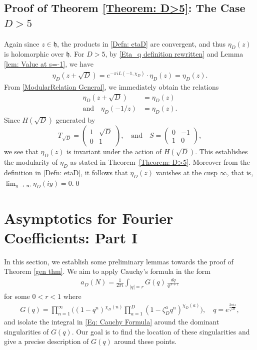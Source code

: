 \documentclass[11pt]{amsart}
\numberwithin{equation}{section}
\theoremstyle{remark}
\begin{document}
\subsection{Proof of Theorem \ref{Theorem: D>5}: The Case $D>5$}
Again since $z \in \mathfrak{h}$, the products in \eqref{Defn: etaD} are convergent, and thus $\eta_{D}(z)$ is holomorphic over $\mathfrak{h}$. For $D>5$, by \eqref{Eta_q definition rewritten} and Lemma \ref{lem: Value at s=-1}, we have
\begin{align}
\eta_{D}(z+\sqrt{D}) =e^{-\pi i L(-1,{\chi_{D}})} \cdot \eta_{D}(z) = \eta_{D}(z).
\end{align}
From \eqref{ModularRelation General}, we immediately obtain the relations
\begin{align}
    \eta_{D}(z+\sqrt{D}) &= \eta_{D}(z) \label{Eq: Relation 1, q>5}\\
    \textrm{and} \quad \eta_{D}(-1/z) &= \eta_{D}(z). \label{Eq: Relation 2, q>5}
\end{align}
Since $H(\sqrt{D})$ generated by 
$$T_{\sqrt{D}}= \begin{pmatrix}1&\sqrt{D}\\0&1\end{pmatrix}, \quad \textrm{and} \quad S = \begin{pmatrix}0&-1\\1&0\end{pmatrix},$$
we see that \( \eta_{D}(z) \) is invariant under the action of \( H(\sqrt{D}) \). This establishes the modularity of \( \eta_{D} \) as stated in Theorem~\ref{Theorem: D>5}. Moreover from the definition in \eqref{Defn: etaD}, it follows that \( \eta_{D}(z) \) vanishes at the cusp $\infty$, that is, $\lim_{y \to \infty} \eta_{D}(iy) = 0.$\qed

\section{Asymptotics for Fourier Coefficients: Part I} \label{Sec: Main Theorem Proof I} In this section, we establish some preliminary lemmas towards the proof of Theorem \ref{gen thm}. We aim to apply Cauchy's formula in the form
\begin{align}\label{Eq: Cauchy Formula}
a_D(N)=\frac{1}{2\pi i}\int_{|q|=r}G(q)\, \frac{dq}{q^{N+1}}
\end{align}
for some $0<r<1$ where
\begin{align}\label{Eq: Product Formula}
G(q) = \prod_{n=1}^\infty \bigg(\left(1-q^n   \right)^{{\chi_{D}}(n)}  \prod_{a=1}^D \left(1-  \zeta_D^a q^n  \right)^{{\chi_{D}}(a)}\bigg), \quad  q = e^{\frac{2\pi i z}{\sqrt{D}}},
\end{align}
and isolate the integral in \eqref{Eq: Cauchy Formula} around the dominant singularities of $G(q)$. Our goal is to find the location of these singularities and give a precise description of $G(q)$ around these points.   
  
\end{document}

